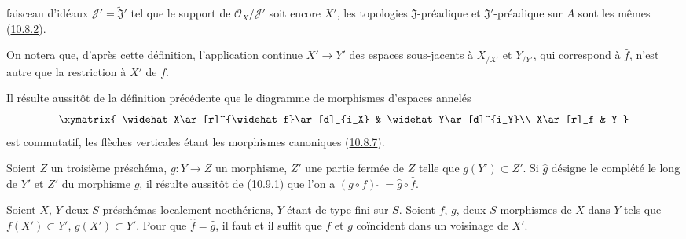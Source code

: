 \begin{env}[10.9.1]

faisceau d'idéaux
$\mathscr{J}'=\widetilde{\mathfrak{J}}'$ tel que le support de
$\mathscr{O}_X/\mathscr{J}'$ soit encore $X'$, les topologies
$\mathfrak{J}$-préadique et $\mathfrak{J}'$-préadique sur $A$ sont les
mêmes (\hyperref[I.10.8.2-fr]{10.8.2}).

On notera que, d'après cette définition, l'application continue
$X'\to Y'$ des espaces sous-jacents à $X_{/X'}$ et $Y_{/Y'}$, qui
correspond à $\widehat f$, n'est autre que la restriction à $X'$ de $f$.
\end{env}

\begin{env}[10.9.2]
\label{I.10.9.2-fr}
Il résulte aussitôt de la définition précédente que le diagramme de
morphismes d'espaces annelés
\[
  \label{I.10.9.2.1-fr}
  \xymatrix{
    \widehat X\ar[r]^{\widehat f}\ar[d]_{i_X} &
    \widehat Y\ar[d]^{i_Y}\\
    X\ar[r]_f &
    Y
  }
\]
est commutatif, les flèches verticales étant les morphismes canoniques
(\hyperref[I.10.8.7-fr]{10.8.7}).
\end{env}

\begin{env}[10.9.3]
\label{I.10.9.3-fr}
Soient $Z$ un troisième préschéma, $g:Y\to Z$ un morphisme, $Z'$ une
partie fermée de $Z$ telle que $g(Y')\subset Z'$. Si $\widehat g$ désigne
le complété le long de $Y'$ et $Z'$ du morphisme $g$, il résulte aussitôt
de (\hyperref[I.10.9.1-fr]{10.9.1}) que l'on a
$(g\circ f){\,\widehat{\,}\,}=\widehat g\circ\widehat f$.
\end{env}

\begin{proposition}[10.9.4]
\label{I.10.9.4-fr}
Soient $X$, $Y$ deux $S$-préschémas localement noethériens, $Y$ étant de
type fini sur $S$. Soient $f$, $g$, deux $S$-morphismes de $X$ dans $Y$
tels que $f(X')\subset Y'$, $g(X')\subset Y'$. Pour que
$\widehat f=\widehat g$, il faut et il suffit que $f$ et $g$ coïncident
dans un voisinage de $X'$.
\end{proposition}

